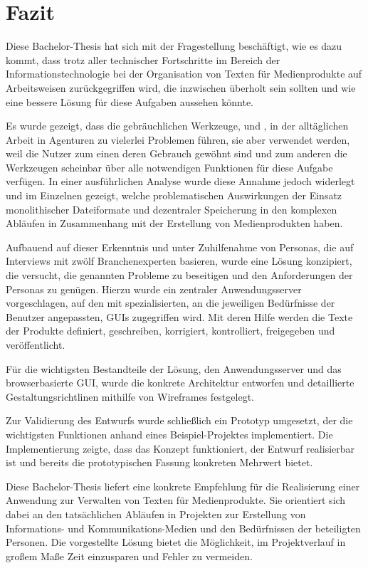 \section{Fazit}\label{l:fazit}

Diese Bachelor-Thesis hat sich mit der Fragestellung beschäftigt, wie es dazu kommt, dass trotz aller technischer Fortschritte im Bereich der Informationstechnologie bei der Organisation von Texten für Medienprodukte auf Arbeitsweisen zurückgegriffen wird, die inzwischen überholt sein sollten und wie eine bessere Lösung für diese Aufgaben aussehen könnte.

Es wurde gezeigt, dass die gebräuchlichen Werkzeuge,  und , in der alltäglichen Arbeit in Agenturen zu vielerlei Problemen führen, sie aber verwendet werden, weil die Nutzer zum einen deren Gebrauch gewöhnt sind und zum anderen die Werkzeugen scheinbar über alle notwendigen Funktionen für diese Aufgabe verfügen. In einer ausführlichen Analyse wurde diese Annahme jedoch widerlegt und im Einzelnen gezeigt, welche problematischen Auswirkungen der Einsatz monolithischer Dateiformate und dezentraler Speicherung in den komplexen Abläufen in Zusammenhang mit der Erstellung von Medienprodukten haben.

Aufbauend auf dieser Erkenntnis und unter Zuhilfenahme von Personas, die auf Interviews mit zwölf Branchenexperten basieren, wurde eine Lösung konzipiert, die versucht, die genannten Probleme zu beseitigen und den Anforderungen der Personas zu genügen. Hierzu wurde ein zentraler Anwendungsserver vorgeschlagen, auf den mit spezialisierten, an die jeweiligen Bedürfnisse der Benutzer angepassten, GUIs zugegriffen wird. Mit deren Hilfe werden die Texte der Produkte definiert, geschreiben, korrigiert, kontrolliert, freigegeben und veröffentlicht.

Für die wichtigsten Bestandteile der Lösung, den Anwendungsserver und das browserbasierte GUI, wurde die konkrete Architektur entworfen und detaillierte Gestaltungsrichtlinen mithilfe von Wireframes festgelegt.

Zur Validierung des Entwurfs wurde schließlich ein Prototyp umgesetzt, der die wichtigsten Funktionen anhand eines Beispiel-Projektes implementiert. Die Implementierung zeigte, dass das Konzept funktioniert, der Entwurf realisierbar ist und bereits die prototypischen Fassung konkreten Mehrwert bietet.

\secbar

Diese Bachelor-Thesis liefert eine konkrete Empfehlung für die Realisierung einer Anwendung zur Verwalten von Texten für Medienprodukte. Sie orientiert sich dabei an den tatsächlichen Abläufen in Projekten zur Erstellung von Informations- und Kommunikations-Medien und den Bedürfnissen der beteiligten Personen. Die vorgestellte Lösung bietet die Möglichkeit, im Projektverlauf in großem Maße Zeit einzusparen und Fehler zu vermeiden.

\pagebreak